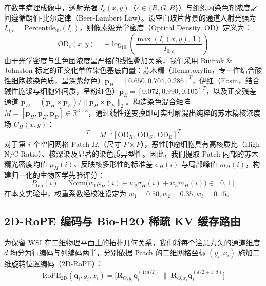 \documentclass[10pt,twocolumn,a4paper]{ctexart}
\begin{document}
在数字病理成像中，透射光强 $I_c(x,y)$（$c \in \{R,G,B\}$）与组织内染色剂浓度之间遵循朗伯-比尔定律（Beer-Lambert Law）。设空白玻片背景的通道入射光强为 $I_{0,c} = \text{Percentile}_{99}(I_c)$，则像素级光学密度（Optical Density, OD）定义为：
\begin{equation}
    \text{OD}_c(x,y) = -\log_{10}\left(\frac{\max(I_c(x,y),\, 1)}{I_{0,c}}\right)
\end{equation}
由于光学密度与生色团浓度呈严格的线性叠加关系，我们采用 Ruifrok \& Johnston 标定的正交化单位染色基底向量：苏木精（Hematoxylin，专一性结合酸性细胞核染色质，呈深紫蓝色）$\mathbf{p}_H = [0.650, 0.704, 0.286]^T$，伊红（Eosin，结合碱性胞浆与细胞外间质，呈粉红色）$\mathbf{p}_E = [0.072, 0.990, 0.105]^T$，以及正交残差通道 $\mathbf{p}_D = (\mathbf{p}_H \times \mathbf{p}_E)/\|\mathbf{p}_H \times \mathbf{p}_E\|_2$。构造染色混合矩阵 $M = [\mathbf{p}_H, \mathbf{p}_E, \mathbf{p}_D] \in \mathbb{R}^{3\times 3}$，通过线性逆变换即可实时解混出纯粹的苏木精核浓度场 $C_H(x,y)$：
\begin{equation}
    [C_H(x,y),\, C_E(x,y),\, C_D(x,y)]^T = M^{-1} [\text{OD}_R,\, \text{OD}_G,\, \text{OD}_B]^T
\end{equation}
对于第 $i$ 个空间网格 Patch $\Omega_i$（尺寸 $P \times P$），恶性肿瘤细胞具有高核质比（High N/C Ratio）、核深染及显著的染色质异型性。因此，我们提取 Patch 内部的苏木精光密度均值 $\mu_H(i)$、反映核多形性的标准差 $\sigma_H(i)$ 与局部峰值 $m_H(i)$，构建归一化的生物医学先验评分：
\begin{equation}
    P_{\text{bio}}(i) = \text{Norm}\Big(w_1 \mu_H(i) + w_2 \sigma_H(i) + w_3 m_H(i)\Big) \in [0, 1]
\end{equation}
在本文实验中，权重系数经校准设定为 $w_1=0.50, w_2=0.35, w_3=0.15$。

\subsection{2D-RoPE 编码与 Bio-H2O 稀疏 KV 缓存路由}

为保留 WSI 在二维物理平面上的拓扑几何关系，我们将每个注意力头的通道维度 $d$ 均分为行编码与列编码两半，分别依据 Patch 的二维网格坐标 $(y_i, x_i)$ 施加二维旋转位置编码（2D-RoPE）：
\begin{equation}
    \text{RoPE}_{2\text{D}}(\mathbf{q}_i, y_i, x_i) = \big[\mathbf{R}_{\Theta, y_i} \mathbf{q}_i^{(1:d/2)} \;\big\|\; \mathbf{R}_{\Theta, x_i} \mathbf{q}_i^{(d/2+1:d)}\big]
\end{equation}
\end{document}
